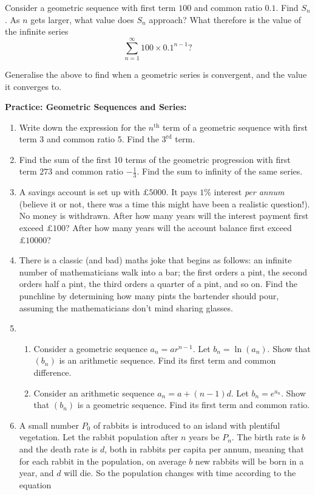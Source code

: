 \documentclass{article}
\begin{document}
\vfill

Consider a geometric sequence with first term $100$ and common ratio $0.1$. Find $S_n$. As $n$ gets larger, what value does $S_n$ approach? What therefore is the value of the infinite series
\[\sum_{n=1}^\infty 100\times0.1^{n-1}?\]

\vfill


Generalise the above to find when a geometric series is convergent, and the value it converges to.






\clearpage


\textbf{Practice: Geometric Sequences and Series:}\bigskip

\begin{enumerate}
	\item Write down the expression for the $n^\mathrm{th}$ term of a geometric sequence with first term $3$ and common ratio $5$. Find the $3^\mathrm{rd}$ term.
	\item Find the sum of the first 10 terms of the geometric progression with first term $273$ and common ratio $-\frac{1}{3}$. Find the sum to infinity of the same series.
	\item A savings account is set up with $\pounds5000$. It pays $1\%$ interest \textit{per annum} (believe it or not, there was a time this might have been a realistic question!). No money is withdrawn. After how many years will the interest payment first exceed $\pounds100$? After how many years will the account balance first exceed $\pounds10000$?
	\item There is a classic (and bad) maths joke that begins as follows: an infinite number of mathematicians walk into a bar; the first orders a pint, the second orders half a pint, the third orders a quarter of a pint, and so on. Find the punchline by determining how many pints the bartender should pour, assuming the mathematicians don't mind sharing glasses.
	\item
		\begin{enumerate}
			\item Consider a geometric sequence $a_n=ar^{n-1}$. Let $b_n=\ln(a_n)$. Show that $(b_n)$ is an arithmetic sequence. Find its first term and common difference.
			\item Consider an arithmetic sequence $a_n=a+(n-1)d$. Let $b_n=e^{a_n}$. Show that $(b_n)$ is a geometric sequence. Find its first term and common ratio.
		\end{enumerate}
	\item A small number $P_0$ of rabbits is introduced to an island with plentiful vegetation. Let the rabbit population after $n$ years be $P_n$. The birth rate is $b$ and the death rate is $d$, both in rabbits per capita per annum, meaning that for each rabbit in the population, on average $b$ new rabbits will be born in a year, and $d$ will die. So the population changes with time according to the equation

\end{enumerate}
\end{document}
